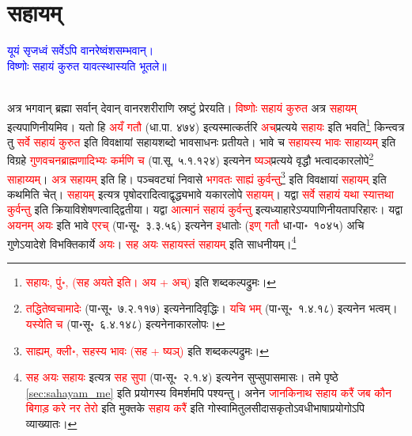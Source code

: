 \section[सहायम्]{सहायम्}
\label{sec:sahayam}
\centering\textcolor{blue}{यूयं सृजध्वं सर्वेऽपि वानरेष्वंशसम्भवान्।\nopagebreak\\
विष्णोः सहायं कुरुत यावत्स्थास्यति भूतले॥}\nopagebreak\\
\\
\begin{sloppypar}\justifying\noindent\hspace{10mm} अत्र भगवान् ब्रह्मा सर्वान् देवान् वानर\-शरीराणि स्रष्टुं प्रेरयति। \textcolor{red}{विष्णोः सहायं कुरुत} अत्र \textcolor{red}{सहायम्} इत्यपाणिनीयमिव। यतो हि \textcolor{red}{अयँ गतौ} (धा.पा. ४७४) इत्यस्मात्कर्तरि \textcolor{red}{अच्‌}\-प्रत्यये \textcolor{red}{सहायः} इति भवति\footnote{\textcolor{red}{सहायः, पुं॰, (सह अयते इति। अय + अच्)} इति शब्द\-कल्प\-द्रुमः।} किन्त्वत्र तु \textcolor{red}{सर्वे सहायं कुरुत} इति विवक्षायां सहाय\-शब्दो भाव\-साधनः प्रतीयते। भावे च \textcolor{red}{सहायस्य भावः साहाय्यम्} इति विग्रहे \textcolor{red}{गुण\-वचन\-ब्राह्मणादिभ्यः कर्मणि च} (पा.सू. ५.१.१२४) इत्यनेन \textcolor{red}{ष्यञ्‌}\-प्रत्यये वृद्धौ भत्वादकार\-लोपे\footnote{\textcolor{red}{तद्धितेष्वचामादेः} (पा॰सू॰~७.२.११७) इत्यनेनादिवृद्धिः। \textcolor{red}{यचि भम्} (पा॰सू॰~१.४.१८) इत्यनेन भत्वम्। \textcolor{red}{यस्येति च} (पा॰सू॰~६.४.१४८) इत्यनेनाकार\-लोपः।} \textcolor{red}{साहाय्यम्}। \textcolor{red}{अत्र सहायम्} इति हि। पञ्चवट्यां निवासे \textcolor{red}{भगवतः साह्यं कुर्वन्तु}\footnote{\textcolor{red}{साह्यम्, क्ली॰, सहस्य भावः (सह + ष्यञ्)} इति शब्दकल्पद्रुमः।} इति विवक्षायां \textcolor{red}{सहायम्} इति कथमिति चेत्। \textcolor{red}{सहायम्} इत्यत्र पृषोदरादित्वाद्वृद्ध्यभावे यकार\-लोपे \textcolor{red}{सहायम्}। यद्वा \textcolor{red}{सर्वे सहायं यथा स्यात्तथा कुर्वन्तु} इति क्रिया\-विशेषणत्वाद्द्वितीया। यद्वा \textcolor{red}{आत्मानं सहायं कुर्वन्तु} इत्यध्याहारेऽप्यपाणिनीयता\-परिहारः। यद्वा \textcolor{red}{अयनम् अयः} इति भावे \textcolor{red}{एरच्} (पा॰सू॰~३.३.५६) इत्यनेन \textcolor{red}{इ}\-धातोः (\textcolor{red}{इण् गतौ} धा॰पा॰~१०४५) अचि गुणेऽयादेशे विभक्ति\-कार्ये \textcolor{red}{अयः}। \textcolor{red}{सह अयः सहायस्तं सहायम्} इति साधनीयम्।\footnote{\textcolor{red}{सह अयः सहायः} इत्यत्र \textcolor{red}{सह सुपा} (पा॰सू॰~२.१.४) इत्यनेन सुप्सुपा\-समासः। \pageref{sec:sahayam_me}तमे पृष्ठे \ref{sec:sahayam_me}  इति प्रयोगस्य विमर्शमपि पश्यन्तु। अनेन \textcolor{red}{जानकिनाथ सहाय करैं जब कौन बिगाड़ करे नर तेरो} इति मुक्तके \textcolor{red}{सहाय करैं} इति गोस्वामि\-तुलसी\-दासकृतोऽवधी\-भाषा\-प्रयोगोऽपि व्याख्यातः।}\end{sloppypar}
